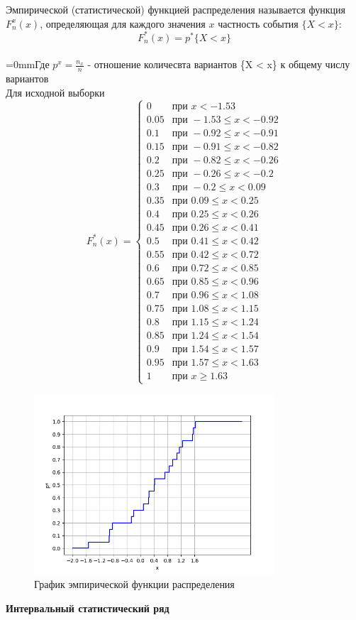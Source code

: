 \smallskip
\parindent=0mm Эмпирической (статистической) функцией распределения называется функция $F_n^x(x)$, определяющая для каждого значения $x$ частность события $\{X < x\}$: $$F_n^*(x) = p^*\{X < x\}$$\\
\parindent=0mmГде $p^x = \frac{{n_x}}{{n}}$ - отношение количесвта вариантов \{X < x\} к общему числу вариантов\\
Для исходной выборки $$F_n^*(x) = \begin{cases}
0 & \text{при } x < -1.53\\
0.05 & \text{при } -1.53\leq x < -0.92\\
0.1 & \text{при } -0.92\leq x < -0.91\\
0.15 & \text{при } -0.91\leq x < -0.82\\
0.2 & \text{при } -0.82\leq x < -0.26\\
0.25 & \text{при } -0.26\leq x < -0.2\\
0.3 & \text{при } -0.2\leq x < 0.09\\
0.35 & \text{при } 0.09\leq x < 0.25\\
0.4 & \text{при } 0.25\leq x < 0.26\\
0.45 & \text{при } 0.26\leq x < 0.41\\
0.5 & \text{при } 0.41\leq x < 0.42\\
0.55 & \text{при } 0.42\leq x < 0.72\\
0.6 & \text{при } 0.72\leq x < 0.85\\
0.65 & \text{при } 0.85\leq x < 0.96\\
0.7 & \text{при } 0.96\leq x < 1.08\\
0.75 & \text{при } 1.08\leq x < 1.15\\
0.8 & \text{при } 1.15\leq x < 1.24\\
0.85 & \text{при } 1.24\leq x < 1.54\\
0.9 & \text{при } 1.54\leq x < 1.57\\
0.95 & \text{при } 1.57\leq x < 1.63\\
1 & \text{при } x \geq 1.63
\end{cases}$$
\begin {figure}[h]\centering\includegraphics[width=0.8\textwidth]{./out/empirical_graph.png}\caption{График эмпирической функции распределения}\label{fig:my_label}\end{figure}
\newpage
\textbf{\large Интервальный статистический ряд}

